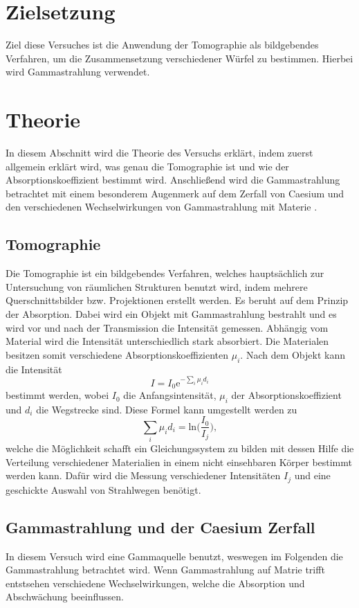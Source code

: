 \section{Zielsetzung}
\label{sec:Zielsetzung}
Ziel diese Versuches ist die Anwendung der Tomographie als bildgebendes Verfahren, um die Zusammensetzung verschiedener Würfel zu bestimmen.
Hierbei wird Gammastrahlung verwendet.

\section{Theorie}
\label{sec:Theorie}
In diesem Abschnitt wird die Theorie des Versuchs erklärt, indem zuerst allgemein erklärt wird, was genau die Tomographie ist und wie der Absorptionskoeffizient bestimmt wird.
Anschließend wird die Gammastrahlung betrachtet mit einem besonderem Augenmerk auf dem Zerfall von Caesium und den verschiedenen Wechselwirkungen von Gammastrahlung mit Materie . 

\subsection{Tomographie}
\label{subsec:Tomographie}
Die Tomographie ist ein bildgebendes Verfahren, welches hauptsächlich zur Untersuchung von räumlichen Strukturen benutzt wird, indem mehrere Querschnittsbilder bzw. Projektionen erstellt werden.
Es beruht auf dem Prinzip der Absorption. Dabei wird ein Objekt mit Gammastrahlung bestrahlt und es wird vor und nach der Transmission die Intensität gemessen. Abhängig vom 
Material wird die Intensität unterschiedlich stark absorbiert. Die Materialen besitzen somit verschiedene Absorptionskoeffizienten $\mu_i$.
Nach dem Objekt kann die Intensität
\begin{equation*}
    I = I_0 \text{e}^{-\sum_i \mu_i d_i}
\end{equation*}
bestimmt werden, wobei $I_0$ die Anfangsintensität, $\mu_i$ der Absorptionskoeffizient und $d_i$ die Wegstrecke sind.
Diese Formel kann umgestellt werden zu
\begin{equation}
    \sum_i \mu_i d_i = \text{ln}\biggl(\frac{I_0}{I_j}\biggr),
\end{equation}
welche die Möglichkeit schafft ein Gleichungssystem zu bilden mit dessen Hilfe die Verteilung verschiedener Materialien in einem nicht einsehbaren Körper bestimmt werden kann.
Dafür wird die Messung verschiedener Intensitäten $I_j$ und eine geschickte Auswahl von Strahlwegen benötigt.

\subsection{Gammastrahlung und der Caesium Zerfall}
\label{subsec:GammaCaesium}
In diesem Versuch wird eine Gammaquelle benutzt, weswegen im Folgenden die Gammastrahlung betrachtet wird. Wenn Gammastrahlung auf Matrie trifft entstsehen verschiedene Wechselwirkungen,
welche die Absorption und Abschwächung beeinflussen. 

